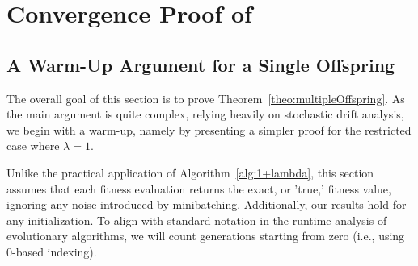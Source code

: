 \newpage
\appendix
\onecolumn


\section{Convergence Proof of \methodname{}}
\label{app:convergence_proof}

\subsection{A Warm-Up Argument for a Single Offspring }

The overall goal of this section is to prove Theorem~\ref{theo:multipleOffspring}. As the main argument is quite complex, relying heavily on stochastic drift analysis, we begin with a warm-up, namely by presenting a simpler proof for the restricted case where $\lambda=1$.

Unlike the practical application of Algorithm~\ref{alg:1+lambda}, this section assumes that each fitness evaluation returns the exact, or 'true,' fitness value, ignoring any noise introduced by minibatching. Additionally, our results hold for any initialization.  To align with standard notation in the runtime analysis of evolutionary algorithms, we will count generations starting from zero (i.e., using 0-based indexing).

